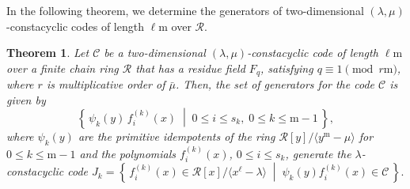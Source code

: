 \documentclass[12pt,a4paper]{article}
\newtheorem{theorem}{Theorem}[section]
\begin{document}
In the following theorem, we determine the generators of two-dimensional $(\lambda,\mu)$-constacyclic codes of length $\ell\mathrm{m}$ over $\mathcal{R}$. 
\begin{theorem}\label{thm:structure}
Let $\mathscr{C}$ be a two-dimensional $(\lambda,\mu)$-constacyclic code of length $\ell\mathrm{m}$ over a finite chain ring $\mathcal{R}$ that has a residue field $F_q$, satisfying $q \equiv 1 \pmod{r\mathrm{m}}$, where $r$ is multiplicative order of $\bar{\mu}$. Then, the set of generators for the code $\mathscr{C}$ is given by 
\[
\left\{\, \psi_k(y)\, f_i^{(k)}(x) \;\middle|\; 0 \le i \le s_{k},\; 0 \le k \le \mathrm{m}-1 \,\right\},
\]
where $\psi_k(y)$ are the primitive idempotents of the ring $\mathcal{R}[y]/\langle y^{\mathrm{m}}-\mu \rangle$ for $0 \le k \le \mathrm{m}-1$ and the polynomials $f_i^{(k)}(x)$, $0 \le i \le s_{k}$, generate the $\lambda$-constacyclic code $J_k = \left\{\, f_i^{(k)}(x) \in \mathcal{R}[x]/\langle x^{\ell}-\lambda \rangle \;\middle|\; \psi_k(y) f_i^{(k)}(x) \in \mathscr{C} \,\right\}.$
\end{theorem}
\end{document}
